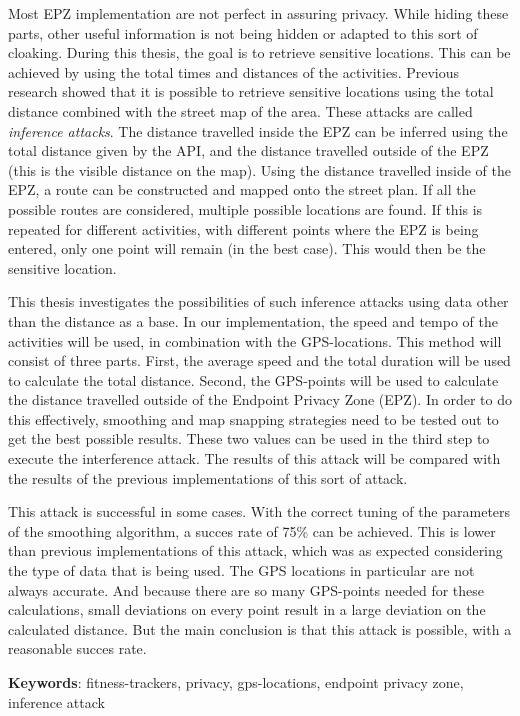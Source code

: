 Most EPZ implementation are not perfect in assuring privacy. While hiding these
parts, other useful information is not being hidden or adapted to this sort of
cloaking. During this thesis, the goal is to retrieve sensitive locations. This
can be achieved by using the total times and distances of the activities.
Previous research showed that it is possible to retrieve sensitive locations
using the total distance combined with the street map of the area. These
attacks are called \textit{inference attacks}. The distance travelled inside
the EPZ can be inferred using the total distance given by the API, and the
distance travelled outside of the EPZ (this is the visible distance on the
map). Using the distance travelled inside of the EPZ, a route can be
constructed and mapped onto the street plan. If all the possible routes are
considered, multiple possible locations are found. If this is repeated for
different activities, with different points where the EPZ is being entered,
only one point will remain (in the best case). This would then be the sensitive
location.

This thesis investigates the possibilities of such inference attacks using data
other than the distance as a base. In our implementation, the speed and tempo
of the activities will be used, in combination with the GPS-locations. This
method will consist of three parts. First, the average speed and the total
duration will be used to calculate the total distance. Second, the GPS-points
will be used to calculate the distance travelled outside of the Endpoint
Privacy Zone (EPZ). In order to do this effectively, smoothing and map snapping
strategies need to be tested out to get the best possible results. These two
values can be used in the third step to execute the interference attack. The
results of this attack will be compared with the results of the previous
implementations of this sort of attack.

This attack is successful in some cases. With the correct tuning of the
parameters of the smoothing algorithm, a succes rate of 75\% can be achieved.
This is lower than previous implementations of this attack, which was as
expected considering the type of data that is being used. The GPS locations in
particular are not always accurate. And because there are so many GPS-points
needed for these calculations, small deviations on every point result in a
large deviation on the calculated distance. But the main conclusion is that
this attack is possible, with a reasonable succes rate.

\textbf{Keywords}: fitness-trackers, privacy, gps-locations, endpoint privacy zone, inference attack